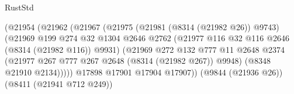 \begin{lexlean}{RustStd}
\begin{coremodule}
                                                (@21954
                                                  (@21962
                                                    (@21967
                                                      (@21975
                                                        (@21981 (@8314 (@21982 @26)) @9743)
                                                        (@21969
                                                          @199
                                                          @274
                                                          @32
                                                          @1304
                                                          @2646
                                                          @2762
                                                          (@21977
                                                            @116
                                                            @32
                                                            @116
                                                            @2646
                                                            (@8314 (@21982 @116))
                                                            @9931)
                                                          (@21969
                                                            @272
                                                            @132
                                                            @777
                                                            @11
                                                            @2648
                                                            @2374
                                                            (@21977
                                                              @267
                                                              @777
                                                              @267
                                                              @2648
                                                              (@8314 (@21982 @267))
                                                              @9948)
                                                            (@8348 @21910 @2134)))))
                                                    @17898
                                                    @17901
                                                    @17904
                                                    @17907))
                                                (@9844 (@21936 @26))
                                                (@8411 (@21941 @712 @249))

\end{coremodule}
\end{lexlean}
